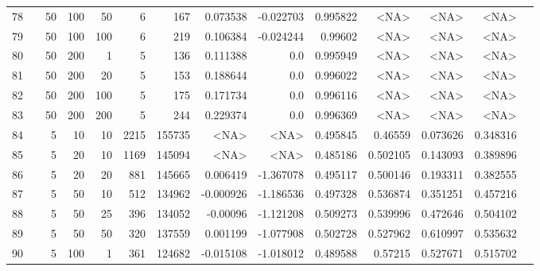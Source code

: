 \begin{longtable}{llrrrrrrrrrrrr}
		78  & &           50 &               100 &           50 &           6 &        167 &  0.073538 & -0.022703 &  0.995822 &        <NA> &           <NA> &      <NA> \\
		79  & &           50 &               100 &          100 &           6 &        219 &  0.106384 & -0.024244 &   0.99602 &        <NA> &           <NA> &      <NA> \\
		80  & &           50 &               200 &            1 &           5 &        136 &  0.111388 &       0.0 &  0.995949 &        <NA> &           <NA> &      <NA> \\
		81  & &           50 &               200 &           20 &           5 &        153 &  0.188644 &       0.0 &  0.996022 &        <NA> &           <NA> &      <NA> \\
		82  & &           50 &               200 &          100 &           5 &        175 &  0.171734 &       0.0 &  0.996116 &        <NA> &           <NA> &      <NA> \\
		83  & &           50 &               200 &          200 &           5 &        244 &  0.229374 &       0.0 &  0.996369 &        <NA> &           <NA> &      <NA> \\\midrule
		84  & \multirow[t]{84}{*}{\rotatebox[origin=r]{90}{sbert-lexrank-weighted}}  &            5 &                10 &           10 &        2215 &     155735 &      <NA> &      <NA> &  0.495845 &     0.46559 &       0.073626 &  0.348316 \\
		85  & &            5 &                20 &           10 &           1169 &     145094 &      <NA> &      <NA> &  0.485186 &    0.502105 &       0.143093 &  0.389896 \\
		86  & &            5 &                20 &           20 &         881 &     145665 &  0.006419 & -1.367078 &  0.495117 &    0.500146 &       0.193311 &  0.382555 \\
		87  & &            5 &                50 &           10 &         512 &     134962 & -0.000926 & -1.186536 &  0.497328 &    0.536874 &       0.351251 &  0.457216 \\
		88  & &            5 &                50 &           25 &         396 &     134052 &  -0.00096 & -1.121208 &  0.509273 &    0.539996 &       0.472646 &  0.504102 \\
		89  & &            5 &                50 &           50 &         320 &     137559 &  0.001199 & -1.077908 &  0.502728 &    0.527962 &       0.610997 &  0.535632 \\
		90  & &            5 &               100 &            1 &         361 &     124682 & -0.015108 & -1.018012 &  0.489588 &     0.57215 &       0.527671 &  0.515702 \\

\end{longtable}
